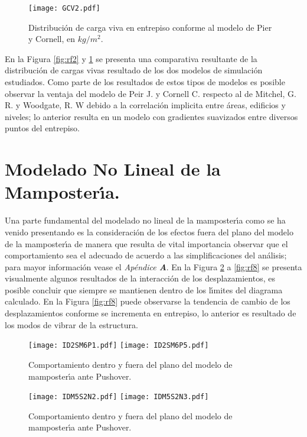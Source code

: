 \begin{figure} [htbp]
\texttt{[image: GCV2.pdf]}
\caption{Distribuci\'on de carga viva en entrepiso conforme al modelo de Pier y Cornell, en $kg/m^{2}$.}
\label{fig:rf3}
\end{figure}

\newpage

En la Figura \ref{fig:rf2} y \ref{fig:rf3} se presenta una comparativa resultante de la distribuci\'on de cargas vivas resultado de los dos modelos de simulaci\'on estudiados. Como parte de los resultados de estos tipos de modelos es posible observar la ventaja del modelo de Peir J. y Cornell C. \cite{PC1973} respecto al de Mitchel, G. R. y Woodgate, R. W \cite{MG1970} debido a la correlaci\'on implicita entre \'areas, edificios y niveles; lo anterior resulta en un modelo con gradientes suavizados entre diversos puntos del entrepiso.

\section{Modelado No Lineal de la Mamposter\'{\i}a.}

Una parte fundamental del modelado no lineal de la mamposter\'{\i}a como se ha venido presentando es la consideraci\'on de los efectos fuera del plano del modelo de la mamposter\'{\i}a de manera que resulta de vital importancia observar que el comportamiento sea el adecuado de acuerdo a las simplificaciones del an\'alisis; para mayor informaci\'on vease el \emph{Ap\'endice \textbf{A}}. En la Figura \ref{fig:rf4} a \ref{fig:rf8} se presenta visualmente algunos resultados de la interacci\'on de los desplazamientos, es posible concluir que siempre se mantienen dentro de los l\'{\i}mites del diagrama calculado. En la Figura \ref{fig:rf8} puede observarse la tendencia de cambio de los desplazamientos conforme se incrementa en entrepiso, lo anterior es resultado de los modos de vibrar de la estructura.

\begin{figure} [htbp]
\texttt{[image: ID2SM6P1.pdf]}
\texttt{[image: ID2SM6P5.pdf]}
\caption{Comportamiento dentro y fuera del plano del modelo de mamposter\'{\i}a ante Pushover.}
\label{fig:rf4}
\end{figure}

\begin{figure} [htbp]
\texttt{[image: IDM5S2N2.pdf]}
\texttt{[image: IDM5S2N3.pdf]}
\caption{Comportamiento dentro y fuera del plano del modelo de mamposter\'{\i}a ante Pushover.}
\label{fig:rf5}
\end{figure}

